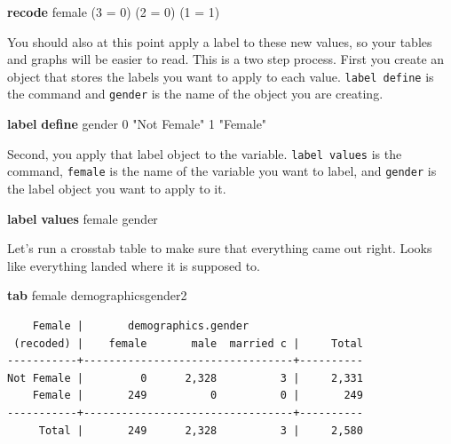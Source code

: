 \documentclass[
]{book}
\newenvironment{Shaded}{\begin{snugshade}}{\end{snugshade}}
\newcommand{\KeywordTok}[1]{\textcolor[rgb]{0.13,0.29,0.53}{\textbf{#1}}}
\newcommand{\NormalTok}[1]{#1}
\newcommand{\StringTok}[1]{\textcolor[rgb]{0.31,0.60,0.02}{#1}}
\begin{document}
\begin{Shaded}
\begin{Highlighting}[]
\KeywordTok{recode}\NormalTok{ female (3 = 0) (2 = 0) (1 = 1) }
\end{Highlighting}
\end{Shaded}

You should also at this point apply a label to these new values, so your tables and graphs will be easier to read. This is a two step process. First you create an object that stores the labels you want to apply to each value. \texttt{label\ define} is the command and \texttt{gender} is the name of the object you are creating.

\begin{Shaded}
\begin{Highlighting}[]
\KeywordTok{label} \KeywordTok{define}\NormalTok{ gender 0 }\StringTok{"Not Female"}\NormalTok{ 1 }\StringTok{"Female"}
\end{Highlighting}
\end{Shaded}

Second, you apply that label object to the variable. \texttt{label\ values} is the command, \texttt{female} is the name of the variable you want to label, and \texttt{gender} is the label object you want to apply to it.

\begin{Shaded}
\begin{Highlighting}[]
\KeywordTok{label} \KeywordTok{values}\NormalTok{ female gender}
\end{Highlighting}
\end{Shaded}

Let's run a crosstab table to make sure that everything came out right. Looks like everything landed where it is supposed to.

\begin{Shaded}
\begin{Highlighting}[]
\KeywordTok{tab}\NormalTok{ female demographicsgender2}
\end{Highlighting}
\end{Shaded}

\begin{verbatim}
    Female |       demographics.gender
 (recoded) |    female       male  married c |     Total
-----------+---------------------------------+----------
Not Female |         0      2,328          3 |     2,331 
    Female |       249          0          0 |       249 
-----------+---------------------------------+----------
     Total |       249      2,328          3 |     2,580 
\end{verbatim}
\end{document}
